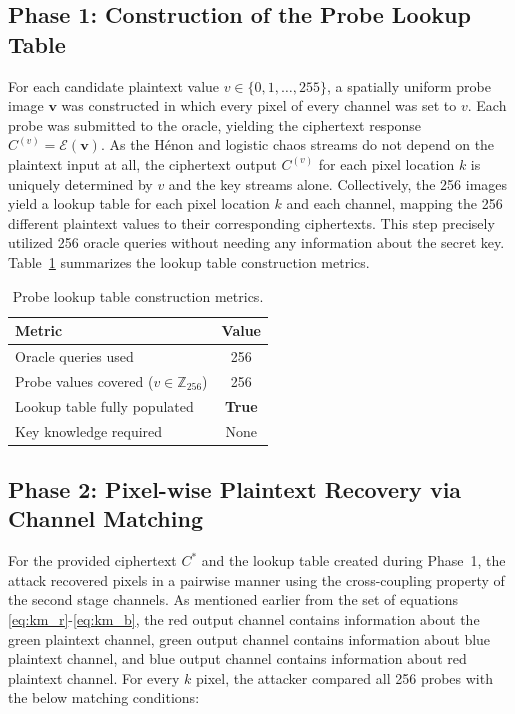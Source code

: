 \subsection{Phase 1: Construction of the Probe Lookup Table}
\label{subsec:exp_phase1}

For each candidate plaintext value $v \in \{0, 1, \ldots, 255\}$, a spatially uniform probe image $\mathbf{v}$ was constructed in which every pixel of every channel was set to $v$. Each probe was submitted to the oracle, yielding the ciphertext response $C^{(v)} = \mathcal{E}(\mathbf{v})$. As the Hénon and logistic chaos streams do not depend on the plaintext input at all, the ciphertext output $C^{(v)}$ for each pixel location $k$ is uniquely determined by $v$ and the key streams alone. Collectively, the 256 images yield a lookup table for each pixel location $k$ and each channel, mapping the 256 different plaintext values to their corresponding ciphertexts. This step precisely utilized 256 oracle queries without needing any information about the secret key. Table~\ref{tab:phase1_results} summarizes the lookup table construction metrics.


\begin{table}[t]
\centering
\caption{Probe lookup table construction metrics.}
\label{tab:phase1_results}
\begin{tabular}{lc}
\toprule
Metric & Value \\
\midrule
Oracle queries used                                      & 256 \\
Probe values covered ($v \in \mathbb{Z}_{256}$)         & 256 \\
Lookup table fully populated                             & \textbf{True} \\
Key knowledge required                                   & None \\
\bottomrule
\end{tabular}
\end{table}

\subsection{Phase 2: Pixel-wise Plaintext Recovery via Channel Matching}
\label{subsec:exp_phase2}

For the provided ciphertext $C^*$ and the lookup table created during Phase~1, the attack recovered pixels in a pairwise manner using the cross-coupling property of the second stage channels. As mentioned earlier from the set of equations \eqref{eq:km_r}-\eqref{eq:km_b}, the red output channel contains information about the green plaintext channel, green output channel contains information about blue plaintext channel, and blue output channel contains information about red plaintext channel. For every $k$ pixel, the attacker compared all 256 probes with the below matching conditions:

